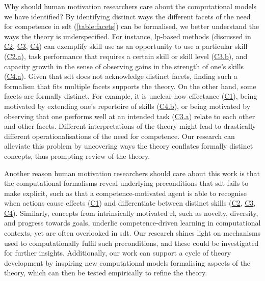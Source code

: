 \documentclass[10pt,letterpaper]{article}
\begin{document}
Why should human motivation researchers care about the computational models we have identified? By identifying distinct ways the different facets of the need for competence in \gls{sdt} (\autoref{table:facets}) can be formalised, we better understand the ways the theory is underspecified. For instance, \gls{lp}-based methods (discussed in \hyperref[sec:skilluse]{C2}, \hyperref[sec:taskperformance]{C3}, \hyperref[sec:capacitygrowth]{C4}) can exemplify skill use as an opportunity to use a particular skill (\hyperref[sec:c2a]{C2.a}), task performance that requires a certain skill or skill level (\hyperref[sec:c3b]{C3.b}), and capacity growth in the sense of observing gains in the strength of one's skills (\hyperref[sec:capacitygrowth]{C4.a}). Given that \gls{sdt} does not acknowledge distinct facets, finding such a formalism that fits multiple facets supports the theory. On the other hand, some facets are formally distinct. For example, it is unclear how effectance (\hyperref[sec:effectance]{C1}), being motivated by extending one's repertoire of skills (\hyperref[sec:capacitygrowth]{C4.b}), or being motivated by observing that one performs well at an intended task (\hyperref[sec:c3a]{C3.a}) relate to each other and other facets. Different interpretations of the theory might lead to drastically different operationalisations of the need for competence. Our research can alleviate this problem by uncovering ways the theory conflates formally distinct concepts, thus prompting review of the theory.

Another reason human motivation researchers should care about this work is that the computational formalisms reveal underlying preconditions that \gls{sdt} fails to make explicit, such as that a competence-motivated agent is able to recognise when actions cause effects (\hyperref[sec:effectance]{C1}) and differentiate between distinct skills (\hyperref[sec:skilluse]{C2}, \hyperref[sec:taskperformance]{C3}, \hyperref[sec:capacitygrowth]{C4}). Similarly, concepts from intrinsically motivated \gls{rl}, such as novelty, diversity, and progress towards goals, underlie competence-driven learning in computational contexts, yet are often overlooked in \gls{sdt}. Our research shines light on mechanisms used to computationally fulfil such preconditions, and these could be investigated for further insights. Additionally, our work can support a cycle of theory development by inspiring new computational models formalising aspects of the theory, which can then be tested empirically to refine the theory.
\end{document}
